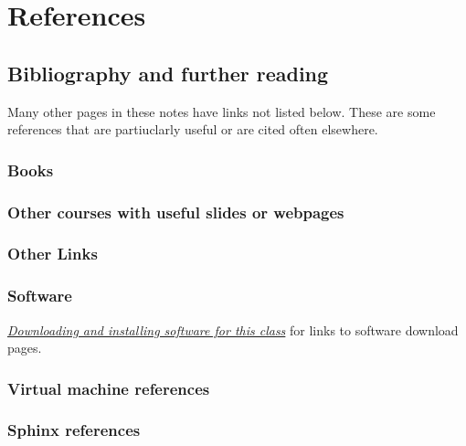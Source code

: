\documentclass[letterpaper,10pt,english]{sphinxmanual}
\begin{document}
\chapter{References}
\label{index:toc-biblio}\label{index:references}

\section{Bibliography and further reading}
\label{biblio:bibliography-and-further-reading}\label{biblio::doc}\label{biblio:biblio}
Many other pages in these notes have links not listed below.  These are some
references that are partiuclarly useful or are cited often elsewhere.


\subsection{Books}
\label{biblio:biblio-books}\label{biblio:books}

\subsection{Other courses with useful slides or webpages}
\label{biblio:other-courses}\label{biblio:other-courses-with-useful-slides-or-webpages}

\subsection{Other Links}
\label{biblio:other-links}\label{biblio:biblio-links}

\subsection{Software}
\label{biblio:software}



{\hyperref[software_installation:software-installation]{\emph{Downloading and installing software for this class}}} for links to software download pages.




\subsection{Virtual machine references}
\label{biblio:biblio-vm}\label{biblio:virtual-machine-references}

\subsection{Sphinx references}
\label{biblio:sphinx-references}\label{biblio:biblio-sphinx}
\end{document}
